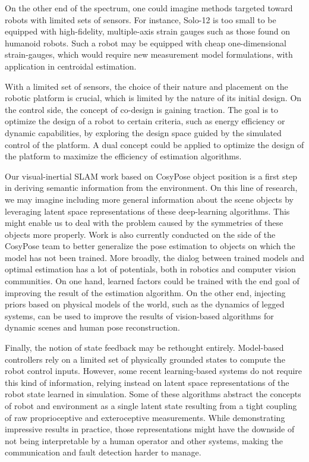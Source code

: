 On the other end of the spectrum, one could imagine methods targeted toward robots with limited sets of sensors. For instance, Solo-12 is too small to be 
equipped with high-fidelity, multiple-axis strain gauges such as those found on humanoid robots. Such a robot may be equipped with cheap
one-dimensional strain-gauges, which would require new measurement model formulations, with application in centroidal estimation.

With a limited set of sensors, the choice of their nature and placement on the robotic platform is crucial, which is limited by the nature of its initial design. 
On the control side, the concept of co-design is gaining traction. The goal is
to optimize the design of a robot to certain criteria, such as energy efficiency or dynamic capabilities, by exploring the design space guided by 
the simulated control of the platform. A dual concept could be applied to optimize the design of the platform to maximize the efficiency of estimation algorithms.

Our visual-inertial SLAM work based on CosyPose object position is a first step in deriving semantic information from the environment. On this line of research, we may imagine
including more general information about the scene objects by leveraging latent space representations of these deep-learning algorithms. This might enable us to deal with the problem
caused by the symmetries of these objects more properly. Work is also currently conducted on the side of the CosyPose team to better generalize the pose estimation to objects on which the 
model has not been trained. More broadly, the dialog between trained models and optimal estimation has a lot of potentials, both in robotics
and computer vision communities. On one hand, learned factors could be trained with the end goal of improving the result of the estimation algorithm. On the other end,
injecting priors based on physical models of the world, such as the dynamics of legged systems, can be used to improve the results of vision-based algorithms
for dynamic scenes and human pose reconstruction.


Finally, the notion of state feedback may be rethought entirely. Model-based controllers rely on a limited set of physically grounded states to compute the robot control inputs. 
However, some recent learning-based systems do not require this kind of information, relying instead on latent space representations of the robot state learned
in simulation. Some of these algorithms abstract the concepts of robot and environment as a single latent state resulting from a tight coupling of raw proprioceptive and exteroceptive
measurements. While demonstrating impressive results in practice, those representations might have the downside of not being interpretable by a human operator and other systems, 
making the communication and fault detection harder to manage.  


